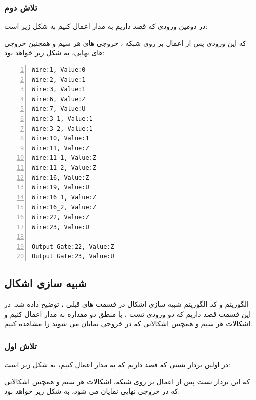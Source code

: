 \subsubsection{تلاش دوم}
در دومین ورودی که قصد داریم به مدار 
اعمال کنیم به شکل زیر است:


که این ورودی پس از اعمال بر روی شبکه ، خروجی های هر سیم و همچنین خروجی های نهایی، به شکل زیر خواهد بود:

\begin{latin}
\begin{lstlisting}[numbers=left, breaklines=true]
Wire:1, Value:0 
Wire:2, Value:1 
Wire:3, Value:1 
Wire:6, Value:Z 
Wire:7, Value:U 
Wire:3_1, Value:1 
Wire:3_2, Value:1 
Wire:10, Value:1 
Wire:11, Value:Z 
Wire:11_1, Value:Z 
Wire:11_2, Value:Z 
Wire:16, Value:Z 
Wire:19, Value:U 
Wire:16_1, Value:Z 
Wire:16_2, Value:Z 
Wire:22, Value:Z 
Wire:23, Value:U 
------------------
Output Gate:22, Value:Z 
Output Gate:23, Value:U 
\end{lstlisting}
\end{latin}

\subsection{شبیه سازی اشکال 
}
الگوریتم و کد الگوریتم شبیه سازی اشکال 
در قسمت های قبلی ، توضیح داده شد. در این قسمت قصد داریم که دو ورودی تست ،‌ با منطق دو مقداره به مدار اعمال کنیم و اشکالات هر سیم و همچنین اشکالاتی که در خروجی نمایان می شوند را مشاهده کنیم.

\subsubsection{تلاش اول}
در اولین بردار تستی که قصد داریم که به مدار 
اعمال کنیم، به شکل زیر است: 


که این بردار تست پس از اعمال بر روی شبکه، اشکالات هر سیم و همچنین اشکالاتی که در خروجی نهایی نمایان می شود، به شکل زیر خواهد بود:


